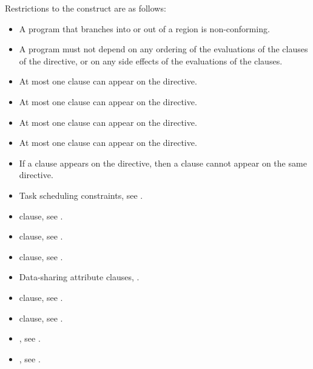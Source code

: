 \linenumbers

\restrictions
Restrictions to the  construct are as follows:

\begin{itemize}
\item A program that branches into or out of a  region is non-conforming.
\item A program must not depend on any ordering of the evaluations of the clauses 
      of the  directive, or on any side effects of the evaluations of 
      the clauses.
\item At most one  clause can appear on the directive.
\item At most one  clause can appear on the directive.
\item At most one  clause can appear on the directive.
\item At most one  clause can appear on the directive.
\item If a  clause appears on the directive, then a  
      clause cannot appear on the same directive.

\end{itemize}

\crossreferences
\begin{itemize}
\item Task scheduling constraints, see .

\item {} clause, see .

\item {} clause, see .

\item {} clause, see .

\item Data-sharing attribute clauses, .

\item {} clause, see .

\item {} clause, see .

\item {}, see .

\item {}, see
.
\end{itemize}



